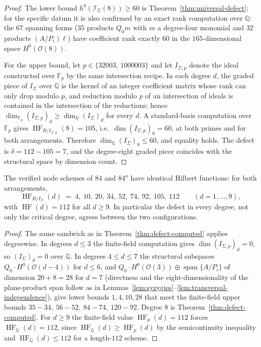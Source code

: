 \begin{proof}
The lower bound $h^0(\mathcal{I}_\Sigma(8)) \geq 60$ is
Theorem~\ref{thm:universal-defect}; for the specific datum it is also
confirmed by an exact rank computation over $\mathbb{Q}$: the $67$ spanning
forms ($35$ products $Q_0 m$ with $m$ a degree-four monomial and $32$
products $(A/P_i)\ell$) have coefficient rank exactly $60$ in the
$165$-dimensional space $H^0(\mathcal{O}(8))$.

For the upper bound, let $p \in \{32003,\, 1000003\}$ and let
$I_{\Sigma,p}$ denote the ideal constructed over $\mathbb{F}_p$ by the same
intersection recipe. In each degree $d$, the graded piece of $I_\Sigma$
over $\mathbb{Q}$ is the kernel of an integer coefficient matrix whose rank
can only drop modulo $p$, and reduction modulo $p$ of an intersection of
ideals is contained in the intersection of the reductions; hence
$\dim_{\mathbb{F}_p} (I_{\Sigma,p})_d \geq \dim_{\mathbb{Q}}
(I_\Sigma)_d$ for every $d$. A standard-basis computation over
$\mathbb{F}_p$ gives $\operatorname{HF}_{R/I_{\Sigma,p}}(8) = 105$, i.e.\
$\dim (I_{\Sigma,p})_8 = 60$, at both primes and for both arrangements.
Therefore $\dim_{\mathbb{Q}} (I_\Sigma)_8 \leq 60$, and equality holds. The
defect is $\delta = 112 - 105 = 7$, and the degree-eight graded piece
coincides with the structural space by dimension count.
\end{proof}

\begin{theorem}\label{thm:postulation}
The verified node schemes of $84$ and $84^{a}$ have identical Hilbert
functions: for both arrangements,
\[
  \operatorname{HF}_{R/I_\Sigma}(d)
  \;=\; 4,\ 10,\ 20,\ 34,\ 52,\ 74,\ 92,\ 105,\ 112
  \qquad (d = 1, \dots, 9),
\]
with $\operatorname{HF}(d) = 112$ for all $d \geq 9$. In particular the
defect in every degree, not only the critical degree, agrees between the
two configurations.
\end{theorem}

\begin{proof}
The same sandwich as in Theorem~\ref{thm:defect-computed} applies
degreewise. In degrees $d \leq 3$ the finite-field computation gives
$\dim (I_{\Sigma,p})_d = 0$, so $(I_\Sigma)_d = 0$ over $\mathbb{Q}$. In
degrees $4 \leq d \leq 7$ the structural subspaces
$Q_0 \cdot H^0(\mathcal{O}(d-4))$ for $d \leq 6$, and
$Q_0 \cdot H^0(\mathcal{O}(3)) \oplus \operatorname{span}\{A/P_i\}$ of
dimension $20 + 8 = 28$ for $d = 7$ (directness and the eight-dimensionality
of the plane-product span follow as in
Lemmas~\ref{lem:syzygies}--\ref{lem:transversal-independence}), give lower
bounds $1, 4, 10, 28$ that meet the finite-field upper bounds
$35 - 34,\ 56 - 52,\ 84 - 74,\ 120 - 92$. Degree $8$ is
Theorem~\ref{thm:defect-computed}. For $d \geq 9$ the finite-field value
$\operatorname{HF}_p(d) = 112$ forces
$\operatorname{HF}_{\mathbb{Q}}(d) = 112$, since
$\operatorname{HF}_{\mathbb{Q}}(d) \geq \operatorname{HF}_p(d)$ by the
semicontinuity inequality and $\operatorname{HF}_{\mathbb{Q}}(d) \leq 112$
for a length-$112$ scheme.
\end{proof}

